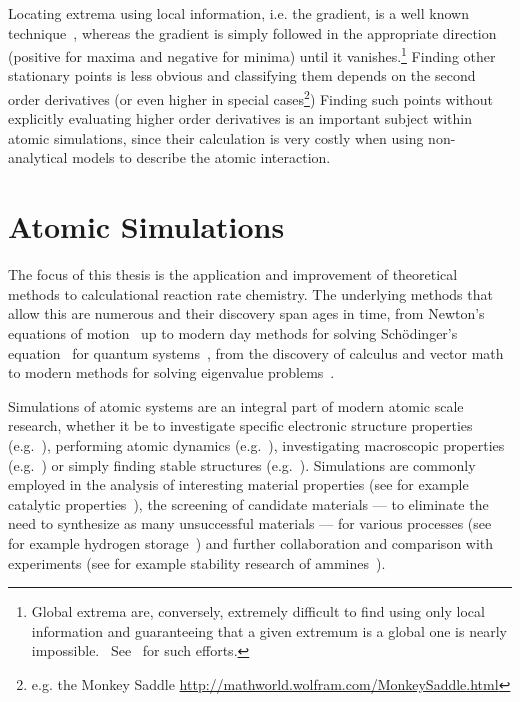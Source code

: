 Locating extrema using local information, i.e. the gradient, is a well known technique~\cite{cg-original-1952}, whereas the gradient is simply followed in the appropriate direction (positive for maxima and negative for minima) until it vanishes.\footnote{Global extrema are, conversely, extremely difficult to find using only local information and guaranteeing that a given extremum is a global one is nearly impossible.~\cite{Stillinger1999} See~\cite{Wang2010, Wales1999, Pickard2011, Oganov2008, Kirkpatrick1983, Johnston2003, Fischer2006} for such efforts.}
Finding other stationary points is less obvious and classifying them depends on the second order derivatives (or even higher in special cases\footnote{e.g. the Monkey Saddle \url{http://mathworld.wolfram.com/MonkeySaddle.html}})
Finding such points without explicitly evaluating higher order derivatives is an important subject within atomic simulations, since their calculation is very costly when using non-analytical models to describe the atomic interaction.

\section{Atomic Simulations}
The focus of this thesis is the application and improvement of theoretical methods to calculational reaction rate chemistry.
The underlying methods that allow this are numerous and their discovery span ages in time, from Newton's equations of motion~\cite{newton-latin} up to modern day methods for solving Sch\"odinger's equation~\cite{schrodinger-equation-1926} for quantum systems~\cite{hohenberg-kohn-1964, gpaw-review-2010, dacapo-1999}, from the discovery of calculus and vector math to modern methods for solving eigenvalue problems~\cite{eigenvalue-problems-2000}.

Simulations of atomic systems are an integral part of modern atomic scale research, whether it be to investigate specific electronic structure properties (e.g.~\cite{electronic-study}), performing atomic dynamics (e.g.~\cite{dynamics-review-2002}), investigating macroscopic properties (e.g.~\cite{macroscopic}) or simply finding stable structures (e.g.~\cite{summer-school-paper-2009}).
Simulations are commonly employed in the analysis of interesting material properties (see for example catalytic properties~\cite{catalytic}), the screening of candidate materials --- to eliminate the need to synthesize as many unsuccessful materials --- for various processes (see for example hydrogen storage~\cite{summer-school-paper-2009}) and further collaboration and comparison with experiments (see for example stability research of ammines~\cite{order-disorder-2010}).

